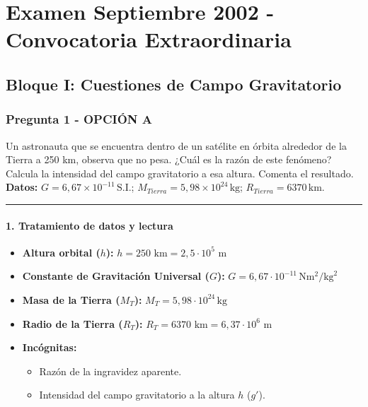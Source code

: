 \chapter{Examen Septiembre 2002 - Convocatoria Extraordinaria}
\label{chap:2002_sep_ext}

\section{Bloque I: Cuestiones de Campo Gravitatorio}
\label{sec:grav_2002_sep_ext}

\subsection{Pregunta 1 - OPCIÓN A}
\label{subsec:1A_2002_sep_ext}

\begin{cajaenunciado}
Un astronauta que se encuentra dentro de un satélite en órbita alrededor de la Tierra a 250 km, observa que no pesa. ¿Cuál es la razón de este fenómeno? Calcula la intensidad del campo gravitatorio a esa altura. Comenta el resultado.
\textbf{Datos:} $G=6,67\times10^{-11}\,\text{S.I.}$; $M_{Tierra}=5,98\times10^{24}\,\text{kg}$; $R_{Tierra}=6370\,\text{km}$.
\end{cajaenunciado}
\hrule

\subsubsection*{1. Tratamiento de datos y lectura}
\begin{itemize}
    \item \textbf{Altura orbital ($h$):} $h = 250 \text{ km} = 2,5 \cdot 10^5 \text{ m}$
    \item \textbf{Constante de Gravitación Universal ($G$):} $G = 6,67 \cdot 10^{-11} \, \text{N}\text{m}^2/\text{kg}^2$
    \item \textbf{Masa de la Tierra ($M_T$):} $M_T = 5,98 \cdot 10^{24} \, \text{kg}$
    \item \textbf{Radio de la Tierra ($R_T$):} $R_T = 6370 \text{ km} = 6,37 \cdot 10^6 \text{ m}$
    \item \textbf{Incógnitas:}
        \begin{itemize}
            \item Razón de la ingravidez aparente.
            \item Intensidad del campo gravitatorio a la altura $h$ ($g'$).
        \end{itemize}
\end{itemize}

